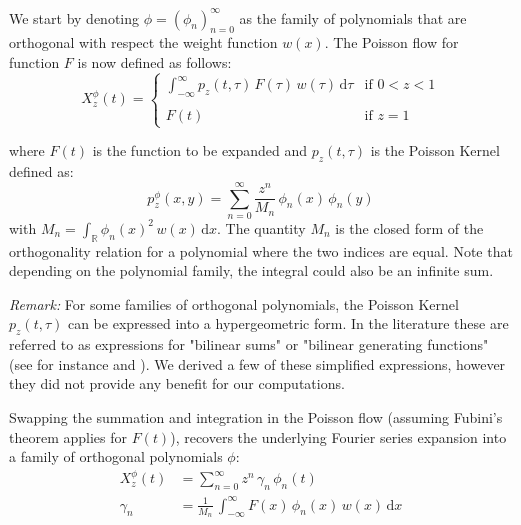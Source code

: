 \documentclass[a4paper,11pt,twoside]{amsart}
\newcommand{\verifiedeq}{=}
\newcommand{\defeq}{=}
\newcommand{\verifiedeq}{\stackrel{\checkmark}{=}}
\newcommand{\defeq}{\stackrel{\scriptscriptstyle \textnormal{def}}{=}}
\begin{document}
We start by denoting $\phi \verifiedeq \left(\phi_n\right)_{n=0}^\infty$ as the family of polynomials that are orthogonal with respect the weight function $w(x)$. The Poisson flow for function $F$ is now defined as follows:
\begin{equation}\label{poiflow}
X^\phi_z(t)\defeq
    \begin{cases}
        \int_{-\infty}^{\infty} p_z(t, \tau)\,F(\tau)\,w(\tau)\,\mathrm{d}\tau & \text{if } 0 < z < 1\\
        \\
        F(t) & \text{if } z = 1
    \end{cases}
\end{equation}

where $F(t)$ is the function to be expanded and $p_z(t, \tau)$ is the Poisson Kernel defined as:
\begin{equation}\label{poiker}
 p^\phi_z(x,y) \defeq \sum_{n=0}^\infty\frac{z^n}{M_n}\, \phi_n(x)\,\phi_n(y)
\end{equation}
with $M_n \verifiedeq \int_\mathbb{R}\phi_n(x)^2\,w(x)\,\mathrm{d}x$. The quantity $M_n$ is the closed form of the orthogonality relation for a polynomial where the two indices are equal. Note that depending on the polynomial family, the integral could also be an infinite sum.

\textit{Remark:} For some families of orthogonal polynomials, the Poisson Kernel $p_z(t, \tau)$ can be expressed into a hypergeometric form. In the literature these are referred to as expressions for "bilinear sums" or "bilinear generating functions" (see for instance \cite{genoverview} and \cite{meipolgen}). We derived a few of these simplified expressions, however they did not provide any benefit for our computations.

Swapping the summation and integration in the Poisson flow (assuming Fubini's theorem applies for $F(t)$), recovers the underlying Fourier series expansion into a family of orthogonal polynomials $\phi$:
\begin{align}
 X^\phi_z(t) &\verifiedeq \sum_{n=0}^\infty z^n\,\gamma_n\,\phi_n(t) \\
 \gamma_n &\verifiedeq \frac{1}{M_n}\,\int_{-\infty}^\infty F(x)\,\phi_n(x)\,w(x) \,\mathrm{d}x
\end{align}
\end{document}
